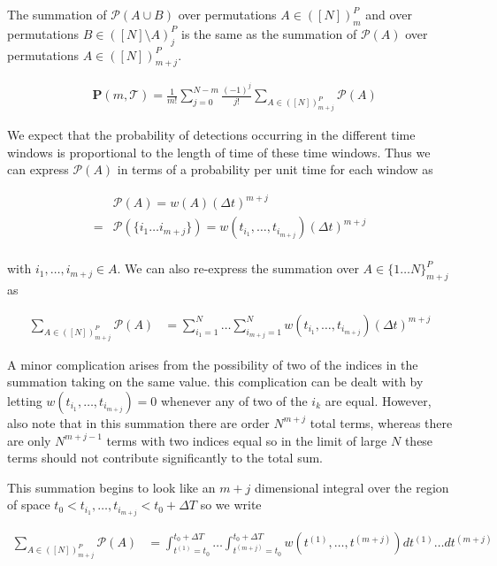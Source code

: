 \documentclass[12pt]{article}
\newcommand{\bv}[1]{\boldsymbol{#1}}
\begin{document}
The summation of $\mathcal{P}(A \cup B)$ over permutations $A\in ([N])_m^P$  and over permutations $B \in ([N]\setminus A)_j^P$  is the same as the summation of $\mathcal{P}(A)$ over permutations $A \in ([N])_{m+j}^P$.

\begin{align}
\label{eq:Pn2}
& \bv{P}(m,\mathcal{T}) = \frac{1}{m!} \sum_{j=0}^{N-m} \frac{(-1)^j}{j!} \sum_{A \in ([N])_{m+j}^P} \mathcal{P}(A)
\end{align}

We expect that the probability of detections occurring in the different time windows is proportional to the length of time of these time windows. Thus we can express $\mathcal{P}(A)$ in terms of a probability per unit time for each window as

\begin{align}
&\mathcal{P}(A) = w(A)(\Delta t)^{m+j}\\
=&\mathcal{P}(\{i_1 \ldots i_{m+j} \}) = w(t_{i_1}, \ldots, t_{i_{m+j}}) (\Delta t)^{m+j}\\
\end{align}

with $i_1, \ldots, i_{m+j} \in A$. We can also re-express the summation over $A \in \{1 \ldots N\}_{m+j}^P$ as 

\begin{align}
\sum_{A \in ([N])_{m+j}^P} \mathcal{P}(A) &= \sum_{i_1 = 1}^N \ldots \sum_{i_{m+j} = 1}^N w(t_{i_1}, \ldots, t_{i_{m+j}}) (\Delta t)^{m+j}
\end{align}

A minor complication arises from the possibility of two of the indices in the summation taking on the same value. this complication can be dealt with by letting $w(t_{i_1}, \ldots, t_{i_{m+j}})=0$ whenever any of two of the $i_k$ are equal. However, also note that in this summation there are order $N^{m+j}$ total terms, whereas there are only $N^{m+j-1}$ terms with two indices equal so in the limit of large $N$ these terms should not contribute significantly to the total sum. 

This summation begins to look like an $m+j$ dimensional integral over the region of space $t_0 < t_{i_1}, \ldots, t_{i_{m+j}} < t_0 + \Delta T$ so we write

\begin{align}
\sum_{A \in ([N])_{m+j}^P} \mathcal{P}(A) &= \int_{t^{(1)} = t_0}^{t_0+\Delta T} \ldots \int_{t^{(m+j)} = t_0}^{t_0+\Delta T} w(t^{(1)}, \ldots, t^{(m+j)}) dt^{(1)}\ldots dt^{(m+j)}
\end{align}
\end{document}
